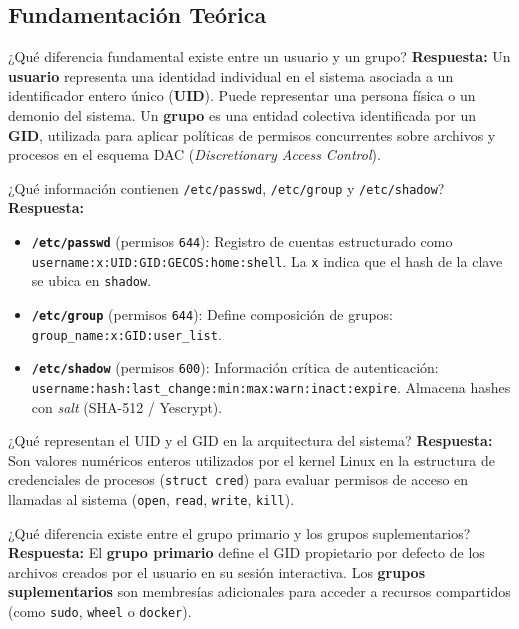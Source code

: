 \documentclass[11pt,a4paper]{article}
\begin{document}
\subsection{Fundamentación Teórica}

\begin{pregunta}{¿Qué diferencia fundamental existe entre un usuario y un grupo?}
    \textbf{Respuesta:} Un \textbf{usuario} representa una identidad individual en el sistema asociada a un identificador entero único (\textbf{UID}). Puede representar una persona física o un demonio del sistema. Un \textbf{grupo} es una entidad colectiva identificada por un \textbf{GID}, utilizada para aplicar políticas de permisos concurrentes sobre archivos y procesos en el esquema DAC (\textit{Discretionary Access Control}).
\end{pregunta}

\begin{pregunta}{¿Qué información contienen \texttt{/etc/passwd}, \texttt{/etc/group} y \texttt{/etc/shadow}?}
    \textbf{Respuesta:}
    \begin{itemize}[leftmargin=*]
        \item \textbf{\texttt{/etc/passwd}} (permisos \texttt{644}): Registro de cuentas estructurado como \texttt{username:x:UID:GID:GECOS:home:shell}. La \texttt{x} indica que el hash de la clave se ubica en \texttt{shadow}.
        \item \textbf{\texttt{/etc/group}} (permisos \texttt{644}): Define composición de grupos: \texttt{group\_name:x:GID:user\_list}.
        \item \textbf{\texttt{/etc/shadow}} (permisos \texttt{600}): Información crítica de autenticación: \texttt{username:hash:last\_change:min:max:warn:inact:expire}. Almacena hashes con \textit{salt} (SHA-512 / Yescrypt).
    \end{itemize}
\end{pregunta}

\begin{pregunta}{¿Qué representan el UID y el GID en la arquitectura del sistema?}
    \textbf{Respuesta:} Son valores numéricos enteros utilizados por el kernel Linux en la estructura de credenciales de procesos (\texttt{struct cred}) para evaluar permisos de acceso en llamadas al sistema (\texttt{open}, \texttt{read}, \texttt{write}, \texttt{kill}).
\end{pregunta}

\begin{pregunta}{¿Qué diferencia existe entre el grupo primario y los grupos suplementarios?}
    \textbf{Respuesta:} El \textbf{grupo primario} define el GID propietario por defecto de los archivos creados por el usuario en su sesión interactiva. Los \textbf{grupos suplementarios} son membresías adicionales para acceder a recursos compartidos (como \texttt{sudo}, \texttt{wheel} o \texttt{docker}).
\end{pregunta}
\end{document}
